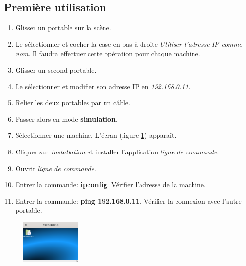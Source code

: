 \documentclass[a4paper,11pt]{article}
\begin{document}
\begin{Form}
\subsection{Première utilisation}
\begin{activite}
\begin{enumerate}
\item Glisser un portable sur la scène.
\item Le sélectionner et cocher la case en bas à droite \emph{Utiliser l'adresse IP comme nom}. Il faudra effectuer cette opération pour chaque machine.
\item Glisser un second portable.
\item Le sélectionner et modifier son adresse IP en \emph{192.168.0.11}.
\item Relier les deux portables par un câble.
\item Passer alors en mode \textbf{simulation}.
\item Sélectionner une machine. L'écran (figure \ref{machine}) apparaît.
\item Cliquer sur \emph{Installation} et installer l'application \emph{ligne de commande}.
\item Ouvrir \emph{ligne de commande}.
\item Entrer la commande: \textbf{ipconfig}. Vérifier l'adresse de la machine.
\item Entrer la commande: \textbf{ping 192.168.0.11}. Vérifier la connexion avec l'autre portable.
\end{enumerate}
\end{activite}
\begin{figure}[!h]
\centering
\includegraphics[width=3cm]{ressources/ecran-machine.png}
\label{machine}
\end{figure}

\end{Form}
\end{document}
